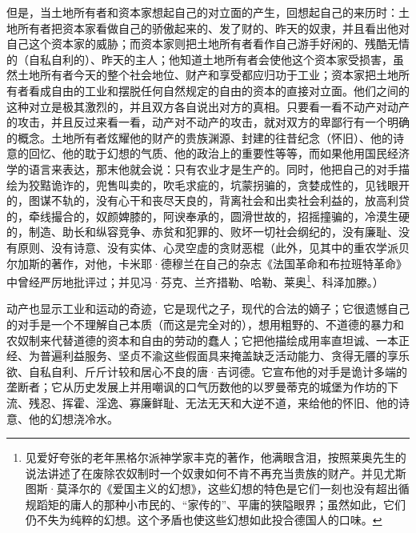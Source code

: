 \documentclass[a4paper,twoside,12pt,AutoFakeBold]{ctexart}
\begin{document}
但是，当土地所有者和资本家想起自己的对立面的产生，回想起自己的来历时：土地所有者把资本家看做自己的骄傲起来的、发了财的、昨天的奴隶，并且看出他对自己这个资本家的威胁；而资本家则把土地所有者看作自己游手好闲的、残酷无情的（自私自利的）、昨天的主人；他知道土地所有者会使他这个资本家受损害，虽然土地所有者今天的整个社会地位、财产和享受都应归功于工业；资本家把土地所有者看成自由的工业和摆脱任何自然规定的自由的资本的直接对立面。他们之间的这种对立是极其激烈的，并且双方各自说出对方的真相。只要看一看不动产对动产的攻击，并且反过来看一看，动产对不动产的攻击，就对双方的卑鄙行有一个明确的概念。土地所有者炫耀他的财产的贵族渊源、封建的往昔纪念（怀旧）、他的诗意的回忆、他的耽于幻想的气质、他的政治上的重要性等等，而如果他用国民经济学的语言来表达，那末他就会说：只有农业才是生产的。同时，他把自己的对手描绘为狡黠诡诈的，兜售叫卖的，吹毛求疵的，坑蒙拐骗的，贪婪成性的，见钱眼开的，图谋不轨的，没有心干和丧尽天良的，背离社会和出卖社会利益的，放高利贷的，牵线撮合的，奴颜婢膝的，阿谀奉承的，圆滑世故的，招摇撞骗的，冷漠生硬的，制造、助长和纵容竞争、赤贫和犯罪的、败坏一切社会纲纪的，没有廉耻、没有原则、没有诗意、没有实体、心灵空虚的贪财恶棍（此外，见其中的重农学派贝尔加斯的著作，对他，卡米耶·德穆兰在自己的杂志《法国革命和布拉班特革命》中曾经严厉地批评过；并见冯·芬克、兰齐措勒、哈勒、莱奥\footnote{见爱好夸张的老年黑格尔派神学家丰克的著作，他满眼含泪，按照莱奥先生的说法讲述了在废除农奴制时一个奴隶如何不肯不再充当贵族的财产。并见尤斯图斯·莫泽尔的《爱国主义的幻想》，这些幻想的特色是它们一刻也没有超出循规蹈矩的庸人的那种小市民的、“家传的”、平庸的狭隘眼界；虽然如此，它们仍不失为纯粹的幻想。这个矛盾也使这些幻想如此投合德国人的口味。}、科泽加滕。）

动产也显示工业和运动的奇迹，它是现代之子，现代的合法的嫡子；它很遗憾自己的对手是一个不理解自己本质（而这是完全对的），想用粗野的、不道德的暴力和农奴制来代替道德的资本和自由的劳动的蠢人；它把他描绘成用率直坦诚、一本正经、为普遍利益服务、坚贞不渝这些假面具来掩盖缺乏活动能力、贪得无餍的享乐欲、自私自利、斤斤计较和居心不良的唐·吉诃德。它宣布他的对手是诡计多端的垄断者；它从历史发展上并用嘲讽的口气历数他的以罗曼蒂克的城堡为作坊的下流、残忍、挥霍、淫逸、寡廉鲜耻、无法无天和大逆不道，来给他的怀旧、他的诗意、他的幻想浇冷水。
\end{document}
